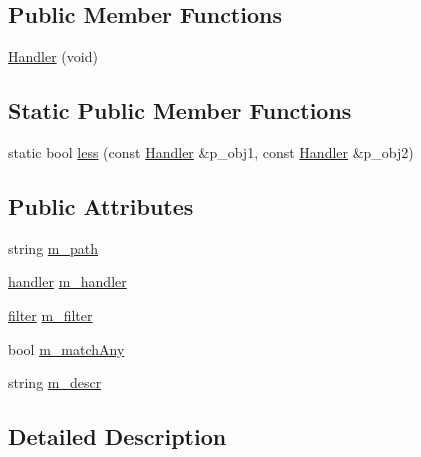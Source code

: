 \subsection*{Public Member Functions}
\begin{DoxyCompactItemize}
\item 
\hyperlink{classxtd_1_1network_1_1http_1_1Server_1_1Handler_a04406da4e0aabcdb2d49862d6cdd3de2}{Handler} (void)
\end{DoxyCompactItemize}
\subsection*{Static Public Member Functions}
\begin{DoxyCompactItemize}
\item 
static bool \hyperlink{classxtd_1_1network_1_1http_1_1Server_1_1Handler_af4d6b33c21a8d5935abe68822f6b29af}{less} (const \hyperlink{classxtd_1_1network_1_1http_1_1Server_1_1Handler}{Handler} \&p\-\_\-obj1, const \hyperlink{classxtd_1_1network_1_1http_1_1Server_1_1Handler}{Handler} \&p\-\_\-obj2)
\end{DoxyCompactItemize}
\subsection*{Public Attributes}
\begin{DoxyCompactItemize}
\item 
string \hyperlink{classxtd_1_1network_1_1http_1_1Server_1_1Handler_a5626894a7be78f8f77879973199973ea}{m\-\_\-path}
\item 
\hyperlink{structxtd_1_1network_1_1http_1_1Server_1_1Handler_1_1handler}{handler} \hyperlink{classxtd_1_1network_1_1http_1_1Server_1_1Handler_a47ad1d68c7d28ffbcbd10671aee30230}{m\-\_\-handler}
\item 
\hyperlink{structxtd_1_1network_1_1http_1_1Server_1_1Handler_1_1filter}{filter} \hyperlink{classxtd_1_1network_1_1http_1_1Server_1_1Handler_ab5e28c0cb7e750a4d2e0307f99839f8e}{m\-\_\-filter}
\item 
bool \hyperlink{classxtd_1_1network_1_1http_1_1Server_1_1Handler_a158d5f20d2ae084fecb125af037f5b71}{m\-\_\-match\-Any}
\item 
string \hyperlink{classxtd_1_1network_1_1http_1_1Server_1_1Handler_a1b4d281770241d5caf4d1d3d2eeb292a}{m\-\_\-descr}
\end{DoxyCompactItemize}


\subsection{Detailed Description}
